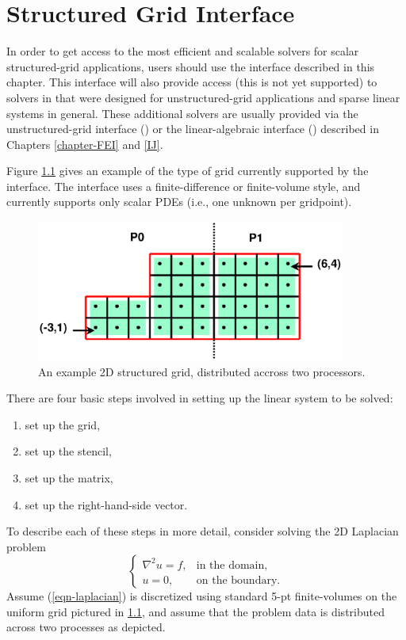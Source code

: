 \chapter{Structured Grid Interface}
\label{Structured Grid Interface}

In order to get access to the most efficient and scalable solvers for
scalar structured-grid applications, users should use the
 interface described in this chapter.  This interface
will also provide access (this is not yet supported) to solvers in
\hypre{} that were designed for unstructured-grid applications and
sparse linear systems in general.  These additional solvers are
usually provided via the unstructured-grid interface () or
the linear-algebraic interface () described in Chapters
\ref{chapter-FEI} and \ref{IJ}.

Figure \ref{fig-fv-grid} gives an example of the type of grid
currently supported by the  interface.  The interface
uses a finite-difference or finite-volume style, and currently
supports only scalar PDEs (i.e., one unknown per gridpoint).
\begin{figure}
\centering
\includegraphics[width=4in]{fv_grid.eps}
\caption{%
An example 2D structured grid, distributed accross two processors.}
\label{fig-fv-grid}
\end{figure}

There are four basic steps involved in setting up the linear system
to be solved:
\begin{enumerate}
\item set up the grid,
\item set up the stencil,
\item set up the matrix,
\item set up the right-hand-side vector.
\end{enumerate}
To describe each of these steps in more detail, consider solving the
2D Laplacian problem
\begin{equation}\label{eqn-laplacian}
\left \{
\begin{array}{ll}
\nabla^2 u = f , & \mbox{in the domain}, \\
u = 0,           & \mbox{on the boundary}.
\end{array}
\right .
\end{equation}
Assume (\ref{eqn-laplacian}) is discretized using standard 5-pt
finite-volumes on the uniform grid pictured in \ref{fig-fv-grid}, and
assume that the problem data is distributed across two processes as
depicted.

